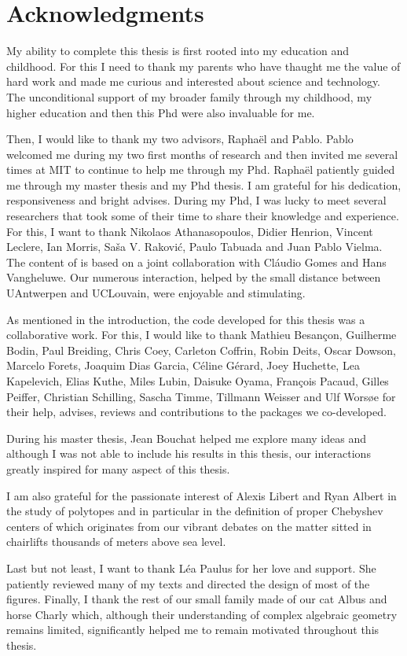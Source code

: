 \chapter*{Acknowledgments}

My ability to complete this thesis is first rooted into my education and
childhood. For this I need to thank my parents who have thaught me the value of hard work
and made me curious and interested about science and technology.
The unconditional support of my broader family through my childhood, my higher education and then this Phd were also invaluable for me.

Then, I would like to thank my two advisors, Raphaël and Pablo.
Pablo welcomed me during my two first months of research and then invited me
several times at MIT to continue to help me through my Phd.
Raphaël patiently guided me through my master thesis and my Phd thesis.
I am grateful for his dedication, responsiveness and bright advises.
During my Phd, I was lucky to meet several researchers that took some of
their time to share their knowledge and experience. For this, I want to thank
Nikolaos Athanasopoulos,
Didier Henrion,
Vincent Leclere,
Ian Morris,
Sa\v{s}a V. Rakovi\'c,
Paulo Tabuada and
Juan Pablo Vielma.
The content of  is based on a joint collaboration with
Cl\'{a}udio Gomes and Hans Vangheluwe.
Our numerous interaction, helped by the small distance between UAntwerpen and UCLouvain,
were enjoyable and stimulating.

As mentioned in the introduction, the code developed for this thesis
was a collaborative work. For this, I would like to thank
Mathieu Besan\c{c}on,
Guilherme Bodin,
Paul Breiding,
Chris Coey,
Carleton Coffrin,
Robin Deits,
Oscar Dowson,
Marcelo Forets,
Joaquim Dias Garcia,
C\'eline G\'erard,
Joey Huchette,
Lea Kapelevich,
Elias Kuthe,
Miles Lubin,
Daisuke Oyama,
Fran\c{c}ois Pacaud,
Gilles Peiffer,
Christian Schilling,
Sascha Timme,
Tillmann Weisser and
Ulf Wors\o{}e
for their help, advises, reviews and contributions to the packages
we co-developed.

During his master thesis, Jean Bouchat helped me explore many ideas and
although I was not able to include his results in this thesis,
our interactions greatly inspired for many aspect of this thesis.

I am also grateful for the passionate interest of Alexis Libert and Ryan Albert
in the study of polytopes and in particular in
the definition of proper Chebyshev centers of 
which originates from our vibrant debates on the matter sitted in chairlifts
thousands of meters above sea level.

Last but not least, I want to thank Léa Paulus for her love and support.
She patiently reviewed many of my texts and directed the design of most of the figures.
Finally, I thank the rest of our small family made of our cat Albus and horse Charly which,
although their understanding of complex algebraic geometry remains limited,
significantly helped me to remain motivated throughout this thesis.
